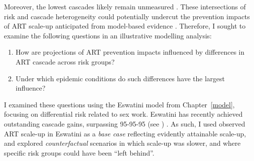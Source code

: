 Moreover, the lowest cascades likely remain unmeasured \cite{Hakim2018,Boothe2021}.
These intersections of risk and cascade heterogeneity
could potentially undercut the prevention impacts of ART scale-up
anticipated from model-based evidence \cite{Baral2019}.
Therefore, I sought to examine the following questions
in an illustrative modelling analysis:
\begin{enumerate}
  \item\label{obj:art.1} How are projections of ART prevention impacts
    influenced by differences in ART cascade across risk groups?
  \item\label{obj:art.2} Under which epidemic conditions
    do such differences have the largest influence?
\end{enumerate}
I examined these questions using the Eswatini model from Chapter~\ref{model},
focusing on differential risk related to sex work.
Eswatini has recently achieved outstanding cascade gains, surpassing 95-95-95
(see ) \cite{Walsh2020,AIDSinfo}.
As such, I used observed ART scale-up in Eswatini as a \emph{base case}
reflecting evidently attainable scale-up,
and explored \emph{counterfactual} scenarios in which scale-up was slower,
and where specific risk groups could have been ``left behind''.
